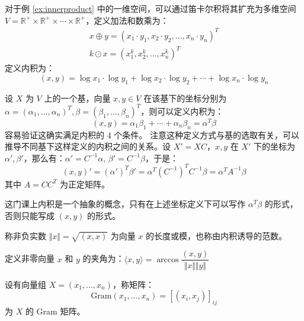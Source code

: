\begin{example}
对于例 \ref{ex:innerproduct} 中的一维空间，可以通过笛卡尔积将其扩充为多维空间 $V=\mathbb R^+\times \mathbb R^+\times\cdots\times \mathbb R^+$，定义加法和数乘为：
\begin{gather*}
    x\oplus y=(x_1\cdot y_1,x_2\cdot y_2,\ldots,x_n\cdot y_n)^T\\
    k\odot x=(x_1^k,x_2^k,\ldots,x_n^k)^T
\end{gather*}
定义内积为：
\[
    (x,y)=\log x_1\cdot\log y_1+\log x_2\cdot\log y_2+\cdots+\log x_n\cdot\log y_n
\]
\end{example}

\begin{example}[根据坐标定义内积]
设 $X$ 为 $V$ 上的一个基，向量 $x,y\in V$ 在该基下的坐标分别为 $\alpha=(\alpha_1,\ldots,\alpha_n)^T,\beta=(\beta_1,\ldots,\beta_n)^T$，则可以定义内积为：
\[
    (x,y)=\alpha_1\beta_1+\cdots+\alpha_n\beta_n=\alpha^T\beta
\]
容易验证这确实满足内积的 4 个条件。
注意这种定义方式与基的选取有关，可以推导不同基下这样定义的内积之间的关系。设 $X'=XC$，$x,y$ 在 $X'$ 下的坐标为 $\alpha',\beta'$，那么有：$\alpha'=C^{-1}\alpha,\,\beta'=C^{-1}\beta$，于是：
\[
    (x,y)'=(\alpha')^T\beta'=\alpha^T(C^{-1})^TC^{-1}\beta=\alpha^T A^{-1}\beta
\]
其中 $A=CC^T$ 为正定矩阵。
\end{example}

\begin{remark}
这门课上内积是一个抽象的概念，只有在上述坐标定义下可以写作 $\alpha^T\beta$ 的形式，否则只能写成 $(x,y)$ 的形式。
\end{remark}

\begin{definition}[长度/模/由内积诱导的范数]
\label{def:inner-product-norm}
称非负实数 $\Vert x\Vert=\sqrt{(x,x)}$ 为向量 $x$ 的长度或模，也称由内积诱导的范数。
\end{definition}

\begin{definition}[夹角]
定义非零向量 $x$ 和 $y$ 的夹角为：$\langle x,y\rangle=\arccos\dfrac{(x,y)}{\Vert x\Vert\Vert y\Vert}$
\end{definition}

\begin{definition}[Gram 矩阵]
设有向量组 $X=(x_1,\ldots,x_n)$，称矩阵：
\[
    \text{Gram}(x_1,\ldots,x_n)=[(x_i,x_j)]_{ij}
\]
为 $X$ 的 Gram 矩阵。
\end{definition}

